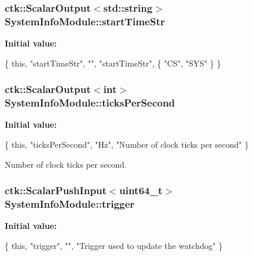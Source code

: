 \subsubsection[{\texorpdfstring{start\+Time\+Str}{startTimeStr}}]{\setlength{\rightskip}{0pt plus 5cm}ctk\+::\+Scalar\+Output$<$std\+::string$>$ System\+Info\+Module\+::start\+Time\+Str}\hypertarget{classSystemInfoModule_ad924ec0d32245d1426556770918c9f55}{}\label{classSystemInfoModule_ad924ec0d32245d1426556770918c9f55}
{\bfseries Initial value\+:}
\begin{DoxyCode}
\{ \textcolor{keyword}{this}, \textcolor{stringliteral}{"startTimeStr"}, \textcolor{stringliteral}{""}, \textcolor{stringliteral}{"startTimeStr"},
        \{ \textcolor{stringliteral}{"CS"}, \textcolor{stringliteral}{"SYS"} \} \}
\end{DoxyCode}
\subsubsection[{\texorpdfstring{ticks\+Per\+Second}{ticksPerSecond}}]{\setlength{\rightskip}{0pt plus 5cm}ctk\+::\+Scalar\+Output$<$int$>$ System\+Info\+Module\+::ticks\+Per\+Second}\hypertarget{classSystemInfoModule_abd71a50e108b76a81fb644ad745582c5}{}\label{classSystemInfoModule_abd71a50e108b76a81fb644ad745582c5}
{\bfseries Initial value\+:}
\begin{DoxyCode}
\{ \textcolor{keyword}{this}, \textcolor{stringliteral}{"ticksPerSecond"}, \textcolor{stringliteral}{"Hz"},
      \textcolor{stringliteral}{"Number of clock ticks per second"} \}
\end{DoxyCode}


Number of clock ticks per second. 

\subsubsection[{\texorpdfstring{trigger}{trigger}}]{\setlength{\rightskip}{0pt plus 5cm}ctk\+::\+Scalar\+Push\+Input$<$uint64\+\_\+t$>$ System\+Info\+Module\+::trigger}\hypertarget{classSystemInfoModule_ae20db3f40537973579c97e235345982b}{}\label{classSystemInfoModule_ae20db3f40537973579c97e235345982b}
{\bfseries Initial value\+:}
\begin{DoxyCode}
\{ \textcolor{keyword}{this}, \textcolor{stringliteral}{"trigger"}, \textcolor{stringliteral}{""},
      \textcolor{stringliteral}{"Trigger used to update the watchdog"} \}
\end{DoxyCode}
